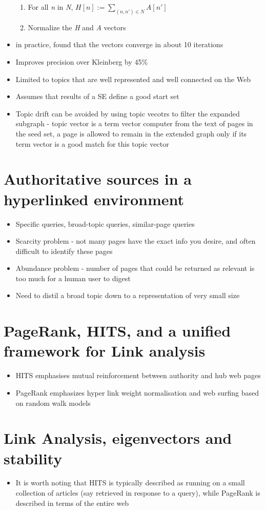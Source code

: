 \documentclass[11pt]{report}
\begin{document}
\begin{itemize}
\begin{enumerate}
\item For all \textit{n} in \textit{N}, $H[n]:=\sum_{(n,n')\in N} A[n']$
\item Normalize the \textit{H} and \textit{A} vectors
\end{enumerate}
\item in practice, found that the vectors converge in about 10 iterations
\item Improves precision over Kleinberg by 45\%
\item Limited to topics that are well represented and well connected on the Web
\item Assumes that results of a SE define a good start set
\item Topic drift can be avoided by using topic vecotrs to filter the expanded subgraph - topic vector is a term vector computer from the text of pages in the seed set, a page is allowed to remain in the extended graph only if its term vector is a good match for this topic vector
\end{itemize}
\section{Authoritative sources in a hyperlinked environment}
\begin{itemize}
\item Specific queries, broad-topic queries, similar-page queries
\item Scarcity problem - not many pages have the exact info you desire, and often difficult to identify these pages
\item Abundance problem - number of pages that could be returned as relevant is too much for a human user to digest
\item Need to distil a broad topic down to a representation of very small size
\end{itemize}
\section{PageRank, HITS, and a unified framework for Link analysis}
\begin{itemize}
\item HITS emphasises mutual reinforcement between authority and hub web pages
\item PageRank emphasizes hyper link weight normalisation and web surfing based on random walk models 
\end{itemize}
\section{Link Analysis, eigenvectors and stability}
\begin{itemize}
\item It is worth noting that HITS is typically described as running on a small collection of articles (say retrieved in response to a query), while PageRank is described in terms of the entire web
\end{itemize}
\end{document}
